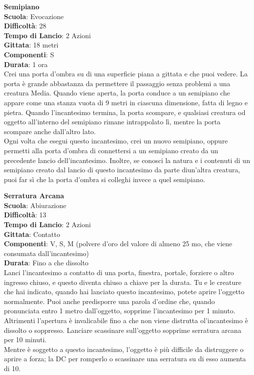 \begin{multicols}{2}
\medskip\textbf{Semipiano}\\
\textbf{Scuola}: Evocazione\\
\textbf{Difficoltà}:  28\\
\textbf{Tempo di Lancio}: 2 Azioni\\
\textbf{Gittata}: 18 metri\\
\textbf{Componenti}: S\\
\textbf{Durata}: 1 ora\\
Crei una porta d’ombra su di una superficie piana a gittata e che puoi vedere. La porta è grande abbastanza da permettere il passaggio senza problemi a una creatura Media. Quando viene aperta, la porta conduce a un semipiano che appare come una stanza vuota di 9 metri in ciascuna dimensione, fatta di legno e pietra. Quando l'incantesimo termina, la porta scompare, e qualsiasi creatura od oggetto all'interno del semipiano rimane intrappolato lì, mentre la porta scompare anche dall'altro lato.\\
Ogni volta che esegui questo incantesimo, crei un nuovo semipiano, oppure permetti alla porta d’ombra di connettersi a un semipiano creato da un precedente lancio dell'incantesimo. Inoltre, se conosci la natura e i contenuti di un semipiano creato dal lancio di questo incantesimo da parte diun'altra creatura, puoi far sì che  la porta d’ombra si colleghi invece a quel semipiano.

\medskip\textbf{Serratura Arcana}\\
\textbf{Scuola}: Abiurazione\\
\textbf{Difficoltà}:  13\\
\textbf{Tempo di Lancio}: 2 Azioni\\
\textbf{Gittata}: Contatto\\
\textbf{Componenti}: V, S, M (polvere d’oro del valore di almeno 25 mo, che viene consumata dall'incantesimo) \\
\textbf{Durata}: Fino a che dissolto\\
Lanci l'incantesimo a contatto di una porta, finestra, portale, forziere o altro ingresso chiuso, e questo diventa chiuso a chiave per la durata. Tu e le creature che hai indicato, quando hai lanciato questo incantesimo, potete aprire l’oggetto normalmente. Puoi anche predisporre una parola d’ordine che, quando pronunciata entro 1 metro dall'oggetto, sopprime l'incantesimo per 1 minuto. Altrimenti l’apertura è invalicabile fino a che non viene distrutta ol'incantesimo è dissolto o  soppresso. Lanciare scassinare sull'oggetto sopprime serratura arcana per 10 minuti.\\
Mentre è soggetto a questo incantesimo, l’oggetto è più difficile da distruggere o aprire a forza; la DC per romperlo o scassinare una serratura su di esso aumenta di 10.


\end{multicols}
